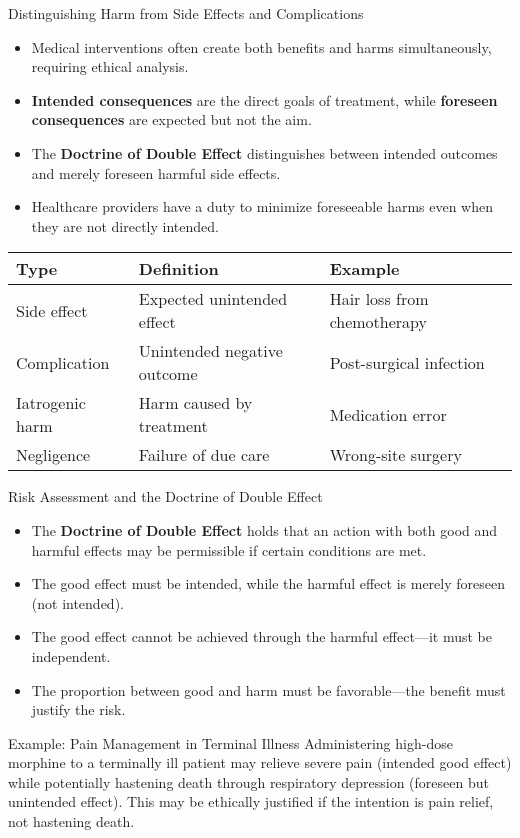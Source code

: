 \documentclass{beamer}
\begin{document}
	\begin{frame}{Distinguishing Harm from Side Effects and Complications}
		\begin{itemize}
			\item Medical interventions often create both benefits and harms simultaneously, requiring ethical analysis.
			\item \textbf{Intended consequences} are the direct goals of treatment, while \textbf{foreseen consequences} are expected but not the aim.
			\item The \textbf{Doctrine of Double Effect} distinguishes between intended outcomes and merely foreseen harmful side effects.
			\item Healthcare providers have a duty to minimize foreseeable harms even when they are not directly intended.
		\end{itemize}
		
		\begin{table}
			\begin{tabular}{l|l|l}
				\textbf{Type} & \textbf{Definition} & \textbf{Example} \\
				\hline
				Side effect & Expected unintended effect & Hair loss from chemotherapy \\
				Complication & Unintended negative outcome & Post-surgical infection \\
				Iatrogenic harm & Harm caused by treatment & Medication error \\
				Negligence & Failure of due care & Wrong-site surgery \\
			\end{tabular}
		\end{table}
	\end{frame}
	
	\begin{frame}{Risk Assessment and the Doctrine of Double Effect}
		\begin{itemize}
			\item The \textbf{Doctrine of Double Effect} holds that an action with both good and harmful effects may be permissible if certain conditions are met.
			\item The good effect must be intended, while the harmful effect is merely foreseen (not intended).
			\item The good effect cannot be achieved through the harmful effect—it must be independent.
			\item The proportion between good and harm must be favorable—the benefit must justify the risk.
		\end{itemize}
		
		\begin{exampleblock}{Example: Pain Management in Terminal Illness}
			Administering high-dose morphine to a terminally ill patient may relieve severe pain (intended good effect) while potentially hastening death through respiratory depression (foreseen but unintended effect). This may be ethically justified if the intention is pain relief, not hastening death.
		\end{exampleblock}
	\end{frame}
	
\end{document}
